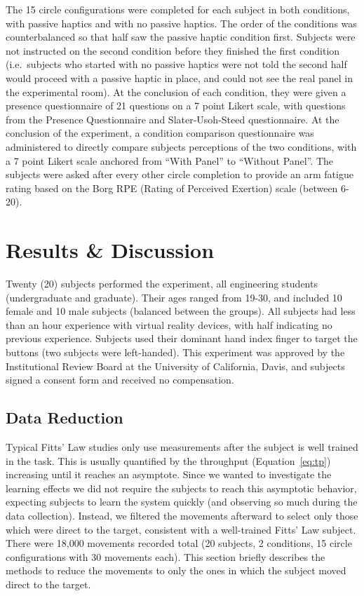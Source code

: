 \documentclass[]{aiaa-tc}%
\begin{document}
The 15 circle configurations were completed for each subject in both conditions, with passive haptics and with no passive haptics.
The order of the conditions was counterbalanced so that half saw the passive haptic condition first.
Subjects were not instructed on the second condition before they finished the first condition (i.e.\ subjects who started with no passive haptics were not told the second half would proceed with a passive haptic in place, and could not see the real panel in the experimental room).
At the conclusion of each condition, they were given a presence questionnaire of 21 questions on a 7 point Likert scale, with questions from the Presence Questionnaire and Slater-Usoh-Steed questionnaire\cite{witmer_measuring_1998,slater_depth_1994}.
At the conclusion of the experiment, a condition comparison questionnaire was administered to directly compare subjects perceptions of the two conditions, with a 7 point Likert scale anchored from ``With Panel'' to ``Without Panel''.
The subjects were asked after every other circle completion to provide an arm fatigue rating based on the Borg RPE (Rating of Perceived Exertion) scale (between 6-20).

\section{Results \& Discussion}
Twenty (20) subjects performed the experiment, all engineering students (undergraduate and graduate).
Their ages ranged from 19-30, and included 10 female and 10 male subjects (balanced between the groups).
All subjects had less than an hour experience with virtual reality devices, with half indicating no previous experience.
Subjects used their dominant hand index finger to target the buttons (two subjects were left-handed).
This experiment was approved by the Institutional Review Board at the University of California, Davis, and subjects signed a consent form and received no compensation.

\subsection{Data Reduction}
Typical Fitts' Law studies only use measurements after the subject is well trained in the task.
This is usually quantified by the throughput (Equation~\ref{eq:tp}) increasing until it reaches an asymptote.
Since we wanted to investigate the learning effects we did not require the subjects to reach this asymptotic behavior, expecting subjects to learn the system quickly (and observing so much during the data collection).
Instead, we filtered the movements afterward to select only those which were direct to the target, consistent with a well-trained Fitts' Law subject.
There were 18,000 movements recorded total (20 subjects, 2 conditions, 15 circle configurations with 30 movements each).
This section briefly describes the methods to reduce the movements to only the ones in which the subject moved direct to the target.
\end{document}

